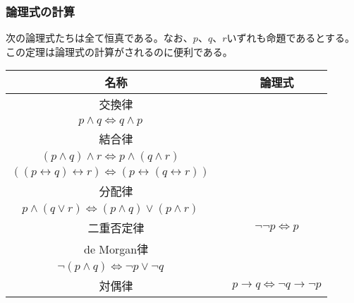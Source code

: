 \documentclass[a4paper]{jsarticle}
\begin{document}
\subsubsection{論理式の計算}%
\begin{thm}
\label{1.1.1.7}
次の論理式たちは全て恒真である。なお、$p$、$q$、$r$いずれも命題であるとする。この定理は論理式の計算がされるのに便利である。
\begin{longtable}[c]{|cc|c|}
\hline
\multicolumn{2}{|c|}{名称} & 論理式 \\
\hline \hline
\multicolumn{2}{|c|}{交換律} & \hspace{-0.5em}\begin{tabular}{c}
  $p \vee q \Leftrightarrow q \vee p $ \\
  $p \land q \Leftrightarrow q \land p$ 
\end{tabular}\\
\hline
\multicolumn{2}{|c|}{結合律} & \hspace{-0.5em}\begin{tabular}{c}
  $(p \vee q) \vee r \Leftrightarrow p \vee (q \vee r) $ \\
  $(p \land q) \land r \Leftrightarrow p \land (q \land r) $ \\
  $\left( (p \leftrightarrow q) \leftrightarrow r \right) \Leftrightarrow \left( p \leftrightarrow (q \leftrightarrow r) \right)$ 
\end{tabular}\\
\hline
\multicolumn{2}{|c|}{分配律} & \hspace{-0.5em}\begin{tabular}{c}
  $p \vee (q \land r) \Leftrightarrow (p \vee q) \land (p \vee r) $ \\
  $p \land (q \vee r) \Leftrightarrow (p \land q) \vee (p \land r) $ 
\end{tabular}\\
\hline
\multicolumn{2}{|c|}{二重否定律} & $\neg\neg p \Leftrightarrow p$ \\
\hline
\multicolumn{2}{|c|}{de Morgan律} & \hspace{-0.5em}\begin{tabular}{c}
  $\neg(p \vee q) \Leftrightarrow \neg p \land \neg q $ \\
  $\neg(p \land q) \Leftrightarrow \neg p \vee \neg q$ 
\end{tabular}\\
\hline
\multicolumn{2}{|c|}{対偶律} & $p \rightarrow q \Leftrightarrow \neg q \rightarrow \neg p$ \\

\end{longtable}
\end{thm}
\end{document}
